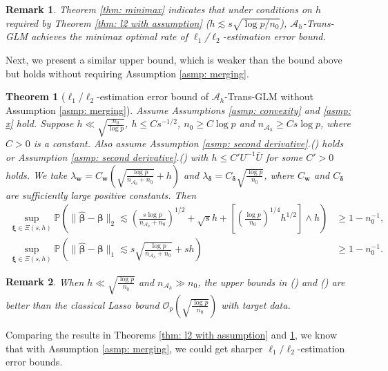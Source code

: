\documentclass[12pt]{article}
\newcommand*{\rom}[1]{\romannumeral #1}
\newcommand{\tp}{\mathbb{P}}
\newcommand{\bxi}{\bm{\xi}}
\newcommand{\bdelta}{\bm{\delta}}
\newcommand{\twonorm}[1]{\|#1\|_{2}}
\newcommand{\onenorm}[1]{\|#1\|_{1}}
\newcommand{\bbeta}{\bm{\beta}}
\newcommand{\hbeta}{\hat{\bm{\beta}}}
\newcommand{\bw}{\bm{w}}
\newcommand{\mah}{\mathcal{A}_h}
\newcommand{\nah}{n_{\mathcal{A}_h}}
\newcommand{\<}{\langle}
\renewcommand{\>}{\rangle}
\newtheorem{theorem}{Theorem}
\newtheorem{remark}{Remark}
\begin{document}
\begin{remark}
	Theorem \ref{thm: minimax} indicates that under conditions on $h$ required by Theorem \ref{thm: l2 with assumption} ($h \lesssim s\sqrt{\log p/n_0}$), $\mah$-Trans-GLM achieves the minimax optimal rate of $\ell_1$/$\ell_2$-estimation error bound.
\end{remark}
Next, we present a similar upper bound, which is weaker than the bound above but holds without requiring Assumption \ref{asmp: merging}.


\begin{theorem}[$\ell_1$/$\ell_2$-estimation error  bound of $\mah$-Trans-GLM without Assumption \ref{asmp: merging}]\label{thm: l2 without assumption}
	Assume Assumptions \ref{asmp: convexity} and \ref{asmp: x} hold.  Suppose $h \ll \sqrt{\frac{n_0}{\log p}}$, $h \leq Cs^{-1/2}$, $n_0 \geq C\log p$ and $\nah \geq Cs\log p$, where $C>0$ is a constant. Also assume Assumption \ref{asmp: second derivative}.(\rom{1}) holds or Assumption \ref{asmp: second derivative}.(\rom{2}) with $h \leq C'U^{-1}\bar{U}$ for some $C' > 0$ holds. We take $\lambda_{\bm{w}} = C_{\bw}\left(\sqrt{\frac{\log p}{\nah+n_0}} + h\right)$ and $\lambda_{\bdelta} = C_{\bdelta}\sqrt{\frac{\log p}{n_0}}$, where $C_{\bw}$ and $C_{\bdelta}$ are sufficiently large positive constants. Then
		\begin{align}
			\sup_{\bxi \in \Xi(s, h)}\tp\left(\twonorm{\hbeta - \bbeta} \lesssim \left(\frac{s\log p}{\nah+n_0}\right)^{1/2} + \sqrt{s}h+ \left[\left(\frac{\log p}{n_0}\right)^{1/4}h^{1/2}\right]\wedge h\right)&\geq 1-n_0^{-1}, \\
			\sup_{\bxi \in \Xi(s, h)}\tp\left(\onenorm{\hbeta - \bbeta} \lesssim s\sqrt{\frac{\log p}{\nah+n_0}} + sh\right)&\geq 1-n_0^{-1}.\label{eq: l1 bound 1 without asmp}
		\end{align}
\end{theorem}

\begin{remark}\label{rmk: h beneficial regime}
	When $h \ll \sqrt{\frac{\log p}{n_0}}$ and $\nah \gg n_0$, the upper bounds in (\rom{1}) and (\rom{2}) are better than the classical Lasso bound $\mathcal{O}_p\left(\sqrt{\frac{\log p}{n_0}}\right)$ with target data.
\end{remark}

Comparing the results in Theorems \ref{thm: l2 with assumption} and \ref{thm: l2 without assumption}, we know that with Assumption \ref{asmp: merging}, we could get sharper $\ell_1/\ell_2$-estimation error bounds.
\end{document}
